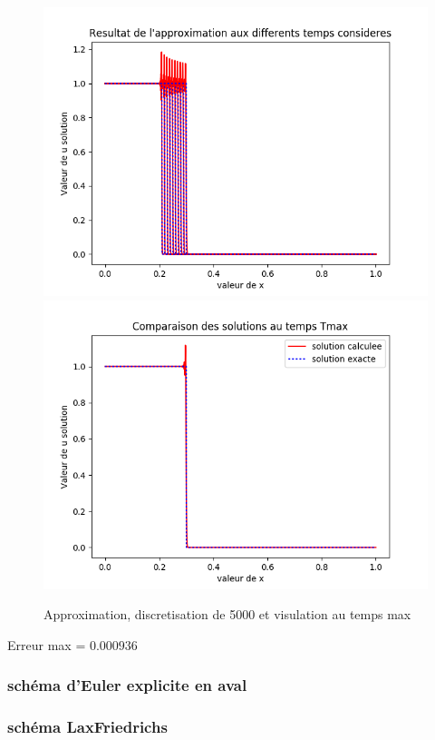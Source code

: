 \documentclass[12pt]{article}
\begin{document}
 \begin{figure}[H]
	\centering
	\includegraphics[scale=0.45]{1D_c1_5000_init3.png}
	\includegraphics[scale=0.45]{Temp_max_c1_5000_init3.png}
	\caption{Approximation, discretisation de 5000 et visulation au temps max}
	\label{1D}
	\end{figure}
Erreur max = $0.000936$
\subsubsection{schéma d'Euler explicite en aval}
\subsubsection{schéma LaxFriedrichs}
\end{document}
